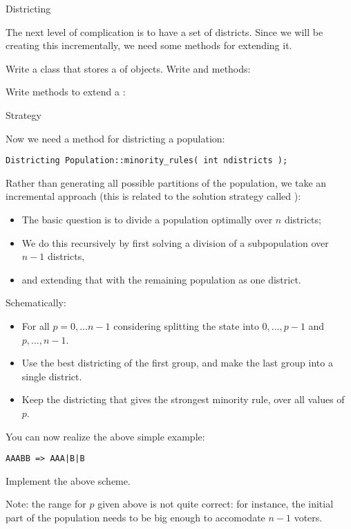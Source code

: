  {Districting}

The next level of complication is to have a set of districts.
Since we
will be creating this incrementally, we need some methods for
extending it.

\begin{exercise}
  Write a class  that stores a  of
   objects. Write  and  methods:
\end{exercise}

\begin{exercise}
  Write methods to extend a :
\end{exercise}

 {Strategy}

Now we need a method for districting a population:
\begin{verbatim}
Districting Population::minority_rules( int ndistricts );
\end{verbatim}
Rather than generating all possible partitions of the population, we
take an incremental approach (this is related to the solution strategy
called ):
\begin{itemize}
\item The basic question is to divide a population optimally over $n$
  districts;
\item We do this recursively by first solving a division of a subpopulation over $n-1$
  districts,
  \item and extending that with the remaining population as one district.
\end{itemize}
Schematically:
\begin{itemize}
\item For all $p=0,\ldots n-1$ considering splitting the state into
  $0,\ldots,p-1$ and $p,\ldots,n-1$.
\item Use the best districting of the first group, and make the last
  group into a single district.
\item Keep the districting that gives the strongest minority rule,
  over all values of~$p$.
\end{itemize}

You can now realize the above simple example:
\begin{verbatim}
AAABB => AAA|B|B
\end{verbatim}

\begin{exercise}
  Implement the above scheme.

  Note: the range for $p$ given above is not quite correct: for instance,
  the initial part of the population needs to be big enough to
  accomodate $n-1$ voters.
\end{exercise}

